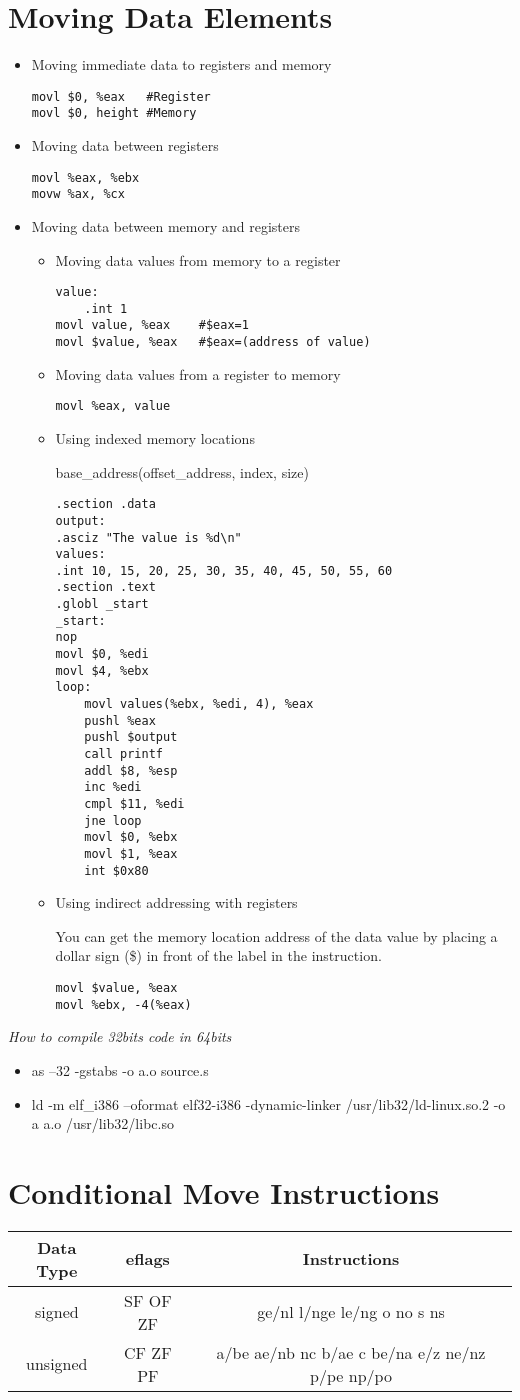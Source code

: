 \section{Moving Data Elements}
\begin{itemize}
	\item Moving immediate data to registers and memory
	\begin{lstlisting}
movl $0, %eax	#Register
movl $0, height	#Memory
	\end{lstlisting}
	\item Moving data between registers
	\begin{lstlisting}
movl %eax, %ebx
movw %ax, %cx
	\end{lstlisting}
	\item Moving data between memory and registers
	\begin{itemize}
		\item Moving data values from memory to a register
		\begin{lstlisting}
value:
	.int 1
movl value, %eax	#$eax=1
movl $value, %eax	#$eax=(address of value)
		\end{lstlisting}
		\item Moving data values from a register to memory
		\begin{lstlisting}
movl %eax, value
		\end{lstlisting}
		\item Using indexed memory locations
		
		base\_address(offset\_address, index, size)
		\begin{lstlisting}
.section .data
output:
.asciz "The value is %d\n"
values:
.int 10, 15, 20, 25, 30, 35, 40, 45, 50, 55, 60
.section .text
.globl _start
_start:
nop
movl $0, %edi
movl $4, %ebx
loop:
	movl values(%ebx, %edi, 4), %eax
	pushl %eax
	pushl $output
	call printf
	addl $8, %esp
	inc %edi
	cmpl $11, %edi
	jne loop
	movl $0, %ebx
	movl $1, %eax
	int $0x80
		\end{lstlisting}
		\item Using indirect addressing with registers
		
		You can get the memory
		location address of the data value by placing a dollar sign (\$) in front of the label in the instruction.
		\begin{lstlisting}
movl $value, %eax
movl %ebx, -4(%eax)
		\end{lstlisting}
	\end{itemize}
\end{itemize}
\colorbox[gray]{0.8}
{
	\parbox{36em}
	{
		\emph{How to compile 32bits code in 64bits}
		\begin{itemize}
			\item as --32 -gstabs -o a.o source.s
			\item ld -m elf\_i386 --oformat elf32-i386 -dynamic-linker /usr/lib32/ld-linux.so.2 -o a a.o /usr/lib32/libc.so
		\end{itemize}
	}
}

\section{Conditional Move Instructions}
\begin{tabular}{c|c|c}
	\hline
	Data Type & eflags & Instructions\\
	\hline
	signed & SF OF ZF & ge/nl l/nge le/ng o no s ns\\
	unsigned & CF ZF PF & a/be ae/nb nc b/ae c be/na e/z ne/nz p/pe np/po\\
\end{tabular}
